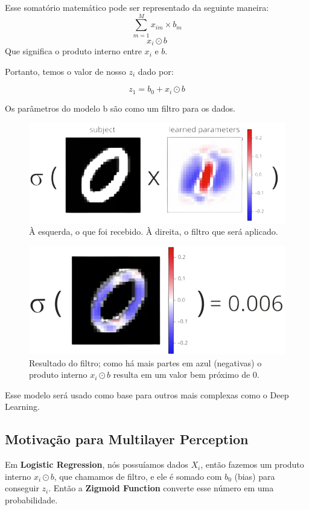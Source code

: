 \documentclass[11pt, a4paper]{article}
\begin{document}
Esse somatório matemático pode ser representado da seguinte maneira:
\[ \sum_{m=1}^{M} x_{im} \times b_m \]
\[ x_i \odot b \]
Que significa o produto interno entre $x_i$ e $b$.

Portanto, temos o valor de nosso $z_i$ dado por:

\[ z_1 = b_0 + x_i \odot b \]

Os parâmetros do modelo b são como um filtro para os dados.

\begin{figure}[h]
\centering
\includegraphics[scale=0.3]{filtro-sigmound}
\caption{À esquerda, o que foi recebido. À direita, o filtro que será aplicado.}
\end{figure}


\begin{figure}[h]
\centering
\includegraphics[scale=0.3]{resultado}
\caption{\centering Resultado do filtro; como há mais partes em azul (negativas) o produto interno $x_i \odot b$ resulta em um valor bem próximo de 0.}
\end{figure}

Esse modelo será usado como base para outros mais complexas como o Deep Learning.

\subsection{Motivação para Multilayer Perception}

Em \textbf{Logistic Regression}, nós possuíamos dados $X_i$, então fazemos um produto interno $x_i \odot b$, que chamamos de filtro, e ele é somado com $b_0$ (bias) para conseguir $z_i$. Então a \textbf{Zigmoid Function} converte esse número em uma probabilidade.
\end{document}
